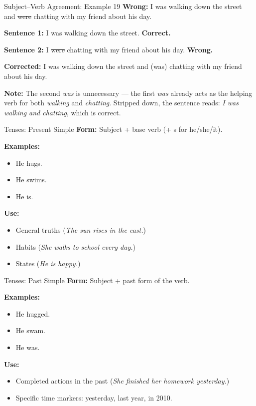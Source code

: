 \documentclass[aspectratio=169,11pt]{beamer}
\begin{document}
\begin{frame}{Subject–Verb Agreement: Example 19}
\small
\textbf{Wrong:} I was walking down the street and \sout{were} chatting with my friend about his day.  

\textbf{Sentence 1:} I was walking down the street. \textbf{Correct.}  

\textbf{Sentence 2:} I \sout{were} chatting with my friend about his day. \textbf{Wrong.}  

\textbf{Corrected:} I was walking down the street and (was) chatting with my friend about his day.  

\vspace{0.5em}
\textbf{Note:} The second \emph{was} is unnecessary — the first \emph{was} already acts as the helping verb for both \emph{walking} and \emph{chatting}.  
Stripped down, the sentence reads: \emph{I was walking and chatting}, which is correct.
\end{frame}

\begin{frame}{Tenses: Present Simple}
\small
\textbf{Form:} Subject + base verb (+ s for he/she/it).  

\textbf{Examples:}
\begin{itemize}
  \item He hugs.
  \item He swims.
  \item He is.
\end{itemize}

\textbf{Use:}
\begin{itemize}
  \item General truths (\emph{The sun rises in the east.})
  \item Habits (\emph{She walks to school every day.})
  \item States (\emph{He is happy.})
\end{itemize}
\end{frame}

\begin{frame}{Tenses: Past Simple}
\small
\textbf{Form:} Subject + past form of the verb.  

\textbf{Examples:}
\begin{itemize}
  \item He hugged.
  \item He swam.
  \item He was.
\end{itemize}

\textbf{Use:}
\begin{itemize}
  \item Completed actions in the past (\emph{She finished her homework yesterday.})
  \item Specific time markers: yesterday, last year, in 2010.
\end{itemize}
\end{frame}
\end{document}
